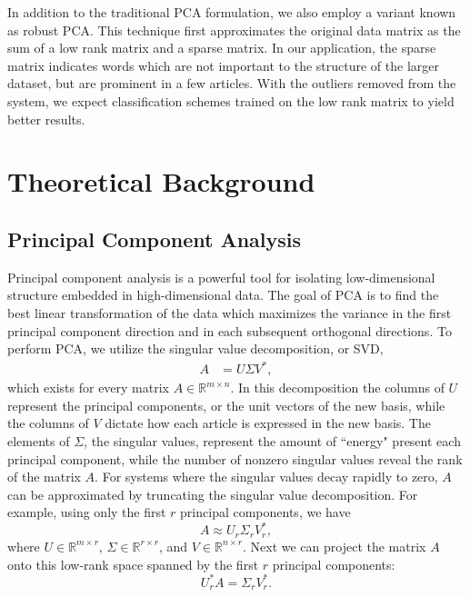 \documentclass[12pt]{article}
\newcommand{\R}{\mathbb{R}}
\begin{document}
In addition to the traditional PCA formulation, we also employ a variant known as robust PCA. This technique first approximates the original data matrix as the sum of a low rank matrix and a sparse matrix. In our application, the sparse matrix indicates words which are not important to the structure of the larger dataset, but are prominent in a few articles. With the outliers removed from the system, we expect classification schemes trained on the low rank matrix to yield better results. 

\section{Theoretical Background}

\subsection{Principal Component Analysis}
Principal component analysis is a powerful tool for isolating low-dimensional
structure embedded in high-dimensional data. The goal of PCA is to find the best
linear transformation of the data which maximizes the variance in the first principal component direction and in each subsequent orthogonal directions. To perform PCA, we utilize the singular value decomposition, or SVD, 
\begin{align} 
A &= U \Sigma V^*,
\label{eq:svd}
\end{align}
which exists for every matrix $A \in \R^{m \times n}.$ In this decomposition the columns of $U$ represent the principal components, or the unit vectors of the new basis, while the columns of $V$ dictate how each article is expressed in the new basis. The elements of $\Sigma$, the singular values, represent the amount of ``energy" present each principal component, while the number of nonzero singular values reveal the rank of the matrix $A$. For systems where the singular values decay rapidly to zero, $A$ can be approximated by truncating the singular value decomposition. For example, using only the first $r$ principal components, we have
\begin{equation}
A \approx U_r \Sigma_r V_r^*,
\end{equation}
where $U \in \R^{m \times r}$, $\Sigma \in \R^{r \times r}$, and $V \in \R^{n \times r}$. Next we can project the matrix $A$ onto this low-rank space spanned by the first $r$ principal components:
\begin{equation}
U_r^* A = \Sigma_r V_r^*.
\end{equation}
\end{document}
